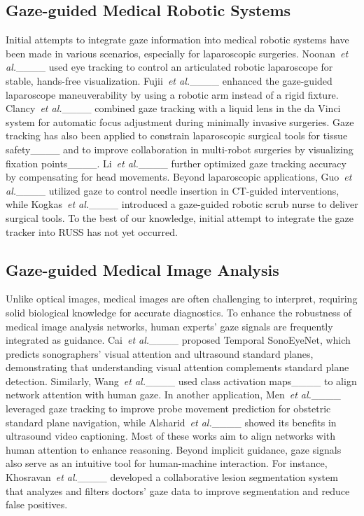 \subsection{Gaze-guided Medical Robotic Systems}
Initial attempts to integrate gaze information into medical robotic systems have been made in various scenarios, especially for laparoscopic surgeries. 
Noonan~\emph{et al.}____ used eye tracking to control an articulated robotic laparoscope for stable, hands-free visualization. Fujii~\emph{et al.}____ enhanced the gaze-guided laparoscope maneuverability by using a robotic arm instead of a rigid fixture. Clancy~\emph{et al.}____ combined gaze tracking with a liquid lens in the da Vinci system for automatic focus adjustment during minimally invasive surgeries. Gaze tracking has also been applied to constrain laparoscopic surgical tools for tissue safety____ and to improve collaboration in multi-robot surgeries by visualizing fixation points____. Li~\emph{et al.}____ further optimized gaze tracking accuracy by compensating for head movements.
Beyond laparoscopic applications, Guo~\emph{et al.}____ utilized gaze to control needle insertion in CT-guided interventions, while Kogkas~\emph{et al.}____ introduced a gaze-guided robotic scrub nurse to deliver surgical tools. To the best of our knowledge, initial attempt to integrate the gaze tracker into RUSS has not yet occurred.

\subsection{Gaze-guided Medical Image Analysis}\label{sec_gaze_med_IA}
Unlike optical images, medical images are often challenging to interpret, requiring solid biological knowledge for accurate diagnostics. To enhance the robustness of medical image analysis networks, human experts' gaze signals are frequently integrated as guidance. Cai~\emph{et al.}____ proposed Temporal SonoEyeNet, which predicts sonographers' visual attention and ultrasound standard planes, demonstrating that understanding visual attention complements standard plane detection. Similarly, Wang~\emph{et al.}____ used class activation maps____ to align network attention with human gaze.
In another application, Men~\emph{et al.}____ leveraged gaze tracking to improve probe movement prediction for obstetric standard plane navigation, while Alsharid~\emph{et al.}____ showed its benefits in ultrasound video captioning. Most of these works aim to align networks with human attention to enhance reasoning. Beyond implicit guidance, gaze signals also serve as an intuitive tool for human-machine interaction. For instance, Khosravan~\emph{et al.}____ developed a collaborative lesion segmentation system that analyzes and filters doctors' gaze data to improve segmentation and reduce false positives.

